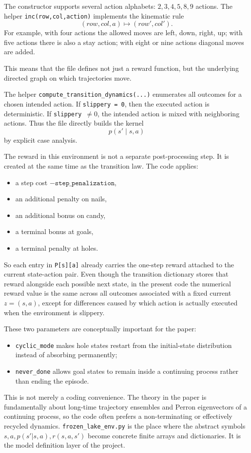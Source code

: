 \documentclass[11pt]{article}
\begin{document}
The constructor supports several action alphabets: \(2,3,4,5,8,9\) actions. The helper
\texttt{inc(row,col,action)} implements the kinematic rule
\begin{equation}
    (row,col,a) \mapsto (row',col').
\end{equation}
For example, with four actions the allowed moves are left, down, right, up; with five actions
there is also a stay action; with eight or nine actions diagonal moves are added.

This means that the file defines not just a reward function, but the underlying directed graph
on which trajectories move.

The helper \texttt{compute\_transition\_dynamics(...)} enumerates all outcomes for a chosen
intended action. If \texttt{slippery = 0}, then the executed action is deterministic. If
\texttt{slippery \(\neq 0\)}, the intended action is mixed with neighboring actions. Thus the
file directly builds the kernel
\begin{equation}
    p(s' \mid s,a)
\end{equation}
by explicit case analysis.

The reward in this environment is not a separate post-processing step. It is created at the
same time as the transition law. The code applies:
\begin{itemize}
    \item a step cost \(-\texttt{step\_penalization}\),
    \item an additional penalty on nails,
    \item an additional bonus on candy,
    \item a terminal bonus at goals,
    \item a terminal penalty at holes.
\end{itemize}
So each entry in \texttt{P[s][a]} already carries the one-step reward attached to the current
state-action pair. Even though the transition dictionary stores that reward alongside each
possible next state, in the present code the numerical reward value is the same across all
outcomes associated with a fixed current \(z=(s,a)\), except for differences caused by which
action is actually executed when the environment is slippery.

These two parameters are conceptually important for the paper:
\begin{itemize}
    \item \texttt{cyclic\_mode} makes hole states restart from the initial-state distribution
    instead of absorbing permanently;
    \item \texttt{never\_done} allows goal states to remain inside a continuing process rather
    than ending the episode.
\end{itemize}
This is not merely a coding convenience. The theory in the paper is fundamentally about
long-time trajectory ensembles and Perron eigenvectors of a continuing process, so the code
often prefers a non-terminating or effectively recycled dynamics.
\medskip
\texttt{frozen\_lake\_env.py} is the place where the abstract symbols
\(s,a,p(s'|s,a),r(s,a,s')\) become concrete finite arrays and dictionaries. It is the model
definition layer of the project.
\end{document}

